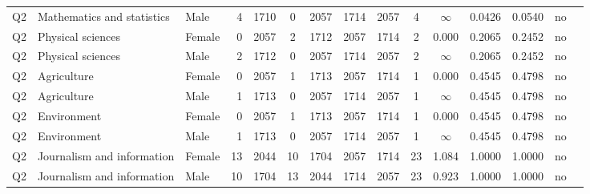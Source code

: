 \begin{longtable}{lllrcccccccccll}
Q2 & Mathematics and statistics & Male & 4 & 1710 & 0 & 2057 & 1714 & 2057 & 4 & $\infty$ & 0.0426 & 0.0540 & no \\
Q2 & Physical sciences & Female & 0 & 2057 & 2 & 1712 & 2057 & 1714 & 2 & 0.000 & 0.2065 & 0.2452 & no \\
Q2 & Physical sciences & Male & 2 & 1712 & 0 & 2057 & 1714 & 2057 & 2 & $\infty$ & 0.2065 & 0.2452 & no \\
Q2 & Agriculture & Female & 0 & 2057 & 1 & 1713 & 2057 & 1714 & 1 & 0.000 & 0.4545 & 0.4798 & no \\
Q2 & Agriculture & Male & 1 & 1713 & 0 & 2057 & 1714 & 2057 & 1 & $\infty$ & 0.4545 & 0.4798 & no \\
Q2 & Environment & Female & 0 & 2057 & 1 & 1713 & 2057 & 1714 & 1 & 0.000 & 0.4545 & 0.4798 & no \\
Q2 & Environment & Male & 1 & 1713 & 0 & 2057 & 1714 & 2057 & 1 & $\infty$ & 0.4545 & 0.4798 & no \\
Q2 & Journalism and information & Female & 13 & 2044 & 10 & 1704 & 2057 & 1714 & 23 & 1.084 & 1.0000 & 1.0000 & no \\
Q2 & Journalism and information & Male & 10 & 1704 & 13 & 2044 & 1714 & 2057 & 23 & 0.923 & 1.0000 & 1.0000 & no \\
\end{longtable}
